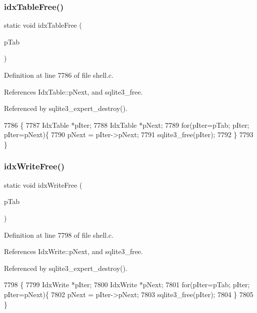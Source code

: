 \subsubsection{idx\+Table\+Free()}
{\footnotesize\ttfamily static void idx\+Table\+Free (\begin{DoxyParamCaption}\item[{\textbf{ Idx\+Table} $\ast$}]{p\+Tab }\end{DoxyParamCaption})\hspace{0.3cm}{\ttfamily [static]}}



Definition at line 7786 of file shell.\+c.



References Idx\+Table\+::p\+Next, and sqlite3\+\_\+free.



Referenced by sqlite3\+\_\+expert\+\_\+destroy().


\begin{DoxyCode}
7786                                         \{
7787   IdxTable *pIter;
7788   IdxTable *pNext;
7789   \textcolor{keywordflow}{for}(pIter=pTab; pIter; pIter=pNext)\{
7790     pNext = pIter->pNext;
7791     sqlite3_free(pIter);
7792   \}
7793 \}
\end{DoxyCode}
\mbox{\label{shell_8c_ad9a2207b0d4c1e15a803f5adb82f08d7}} 
\subsubsection{idx\+Write\+Free()}
{\footnotesize\ttfamily static void idx\+Write\+Free (\begin{DoxyParamCaption}\item[{\textbf{ Idx\+Write} $\ast$}]{p\+Tab }\end{DoxyParamCaption})\hspace{0.3cm}{\ttfamily [static]}}



Definition at line 7798 of file shell.\+c.



References Idx\+Write\+::p\+Next, and sqlite3\+\_\+free.



Referenced by sqlite3\+\_\+expert\+\_\+destroy().


\begin{DoxyCode}
7798                                         \{
7799   IdxWrite *pIter;
7800   IdxWrite *pNext;
7801   \textcolor{keywordflow}{for}(pIter=pTab; pIter; pIter=pNext)\{
7802     pNext = pIter->pNext;
7803     sqlite3_free(pIter);
7804   \}
7805 \}
\end{DoxyCode}
\mbox{\label{shell_8c_a7f9859493159d29216b52e19bcee70d2}} 
